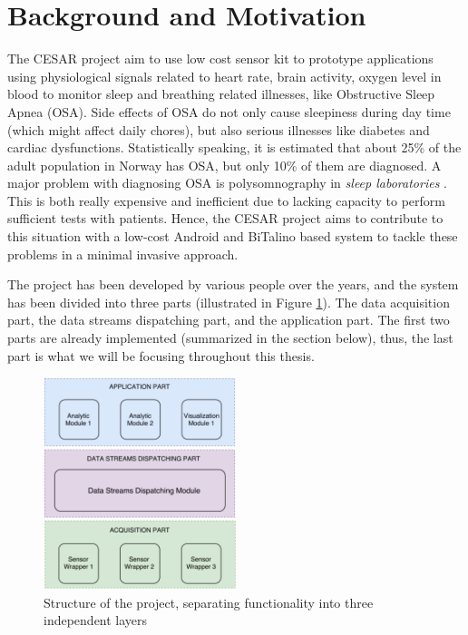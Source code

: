 \section{Background and Motivation}

The CESAR project aim to use low cost sensor kit to prototype applications using physiological signals related to heart rate, brain activity, oxygen level in blood to monitor sleep and breathing related illnesses, like Obstructive Sleep Apnea (OSA). Side effects of OSA do not only cause sleepiness during day time (which might affect daily chores), but also serious illnesses like diabetes and cardiac dysfunctions. Statistically speaking, it is estimated that about 25\% of the adult population in Norway has OSA, but only 10\% of them are diagnosed. A major problem with diagnosing OSA is polysomnography in \textit{sleep laboratories} \cite{cesar}. This is both really expensive and inefficient due to lacking capacity to perform sufficient tests with patients. Hence, the CESAR project aims to contribute to this situation with a low-cost Android and BiTalino based system to tackle these problems in a minimal invasive approach. 

The project has been developed by various people over the years, and the system has been divided into three parts (illustrated in Figure \ref{fig:parts}). The data acquisition part, the data streams dispatching part, and the application part. The first two parts are already implemented (summarized in the section below), thus, the last part is what we will be focusing throughout this thesis. 

\begin{figure}
    \centering
    \includegraphics[width=0.5\textwidth]{images/parts.png}
    \caption{Structure of the project, separating functionality into three independent layers \cite{daniel}}
    \label{fig:parts}
\end{figure}
